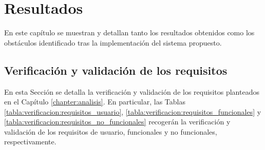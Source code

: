 \chapter{Resultados}
\label{chapter:resultados}


En este capítulo se muestran y detallan tanto los resultados obtenidos como los obstáculos identificado tras la implementación del sistema propuesto.

\section{Verificación y validación de los requisitos}

    En esta Sección se detalla la verificación y validación de los requisitos planteados en el Capítulo \ref{chapter:analisis}. En particular, las Tablas \ref{tabla:verificacion:requisitos_usuario}, \ref{tabla:verificacion:requisitos_funcionales} y \ref{tabla:verificacion:requisitos_no_funcionales} recogerán la verificación y validación de los requisitos de usuario, funcionales y no funcionales, respectivamente.

